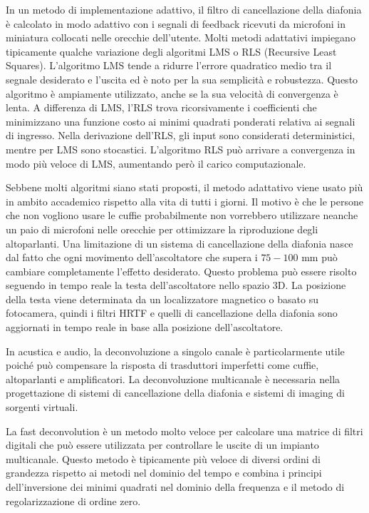 \documentclass[12pt,a4paper,titlepage]{article}
\begin{document}
In un metodo di implementazione adattivo, il filtro di cancellazione della  diafonia è calcolato in modo adattivo con i segnali di feedback ricevuti da
microfoni in miniatura collocati nelle orecchie dell'utente. Molti metodi adattativi impiegano tipicamente qualche variazione degli algoritmi LMS o RLS (Recursive Least Squares). L'algoritmo LMS tende a ridurre l'errore quadratico medio tra il segnale desiderato e l'uscita ed è noto per la sua semplicità e robustezza. Questo algoritmo è ampiamente utilizzato, anche se la sua velocità di convergenza è lenta. A differenza di LMS, l'RLS trova ricorsivamente i coefficienti che minimizzano una funzione costo ai minimi quadrati ponderati relativa ai segnali di ingresso. Nella derivazione dell'RLS, gli input sono considerati deterministici, mentre per LMS sono stocastici. L'algoritmo RLS può arrivare a convergenza in modo più veloce di LMS, aumentando però il carico computazionale.

Sebbene molti algoritmi siano stati proposti, il metodo adattativo viene usato più in ambito accademico rispetto alla vita di tutti i giorni. Il motivo è che le persone che non vogliono usare le cuffie probabilmente non vorrebbero utilizzare neanche un paio di microfoni nelle orecchie per ottimizzare la riproduzione degli altoparlanti. Una limitazione di un sistema di cancellazione della diafonia nasce dal fatto che ogni movimento dell'ascoltatore che supera i $75-100$ \si{\milli \meter} può cambiare completamente l'effetto desiderato. Questo problema può essere risolto seguendo in tempo reale la testa dell'ascoltatore nello spazio 3D. La posizione della testa viene determinata da un localizzatore magnetico o basato su fotocamera, quindi i filtri HRTF e quelli di cancellazione della diafonia sono aggiornati in tempo reale in base alla posizione dell'ascoltatore.

In acustica e audio, la deconvoluzione a singolo canale è particolarmente utile poiché può compensare la risposta di trasduttori imperfetti come cuffie, altoparlanti e amplificatori. La deconvoluzione multicanale è necessaria nella progettazione di sistemi di cancellazione della diafonia e sistemi di imaging di sorgenti virtuali.%

La fast deconvolution è un metodo molto veloce per calcolare una matrice di filtri digitali che può essere utilizzata per controllare le uscite di un impianto multicanale. Questo metodo è tipicamente più veloce di diversi ordini di grandezza rispetto ai metodi nel dominio del tempo e combina i principi dell'inversione dei minimi quadrati nel dominio della frequenza e il metodo di regolarizzazione di ordine zero.%
\end{document}
